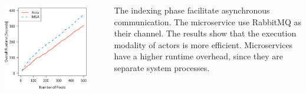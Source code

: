 \documentclass[final,hyperref={pdfpagelabels=true}]{beamer}
\begin{document}
\begin{frame}
\begin{columns}[t]
\begin{column}{.45\textwidth}
      
      \begin{columns}[t]
        \begin{column}{.4\textwidth}
          \includegraphics[width=1\textwidth]{graphics/eval-index-overall.pdf}
        \end{column}
        \begin{column}{.05\textwidth}
        \end{column}
        \begin{column}{.55\textwidth}
          {\lmodern
            The indexing phase facilitate asynchronous communication. The microservice use RabbitMQ as their channel. The results show that the execution modality of actors is more efficient. Microservices have a higher runtime overhead, since they are separate system processes. 
          }
        \end{column}
      \end{columns}


\end{column}
\end{columns}
\end{frame}
\end{document}
